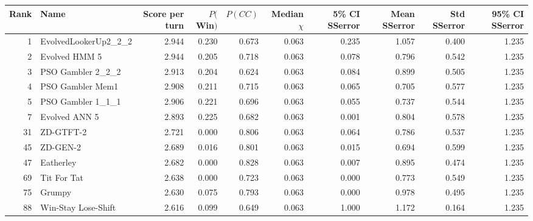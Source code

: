 \begin{tabular}{rlrrrrrrrr}
\toprule
 Rank &                   Name &  Score per turn &  $P($Win$)$ &  $P(CC)$ &  Median $\chi$ &  5\% CI SSerror &  Mean SSerror &  Std SSerror &  95\% CI SSerror \\
\midrule
    1 &   EvolvedLookerUp2\_2\_2 &           2.944 &       0.230 &    0.673 &          0.063 &          0.235 &         1.057 &        0.400 &           1.235 \\
    2 &          Evolved HMM 5 &           2.944 &       0.205 &    0.718 &          0.063 &          0.078 &         0.796 &        0.542 &           1.235 \\
    3 &      PSO Gambler 2\_2\_2 &           2.913 &       0.204 &    0.624 &          0.063 &          0.084 &         0.899 &        0.505 &           1.235 \\
    4 &       PSO Gambler Mem1 &           2.908 &       0.211 &    0.715 &          0.063 &          0.065 &         0.705 &        0.577 &           1.235 \\
    5 &      PSO Gambler 1\_1\_1 &           2.906 &       0.221 &    0.696 &          0.063 &          0.055 &         0.737 &        0.544 &           1.235 \\
    7 &          Evolved ANN 5 &           2.893 &       0.225 &    0.682 &          0.063 &          0.001 &         0.804 &        0.578 &           1.235 \\
   31 &              ZD-GTFT-2 &           2.721 &       0.000 &    0.806 &          0.063 &          0.064 &         0.786 &        0.537 &           1.235 \\
   45 &               ZD-GEN-2 &           2.689 &       0.016 &    0.801 &          0.063 &          0.015 &         0.694 &        0.599 &           1.235 \\
   47 &              Eatherley &           2.682 &       0.000 &    0.828 &          0.063 &          0.007 &         0.895 &        0.474 &           1.235 \\
   69 &            Tit For Tat &           2.638 &       0.000 &    0.723 &          0.063 &          0.000 &         0.773 &        0.549 &           1.235 \\
   75 &                 Grumpy &           2.630 &       0.075 &    0.793 &          0.063 &          0.000 &         0.978 &        0.495 &           1.235 \\
   88 &    Win-Stay Lose-Shift &           2.616 &       0.099 &    0.649 &          0.063 &          1.000 &         1.172 &        0.164 &           1.235 \\

\end{tabular}
